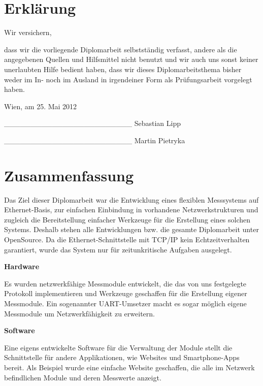 \documentclass[a4paper,14pt,headsepline]{scrartcl}
\begin{document}
\newpage

\onehalfspacing

\section*{Erklärung}
Wir versichern,

dass wir die vorliegende Diplomarbeit selbstständig verfasst, andere als die angegebenen Quellen und Hilfsmittel nicht benutzt und wir auch uns sonst keiner unerlaubten Hilfe bedient haben, dass wir dieses Diplomarbeitsthema bisher weder im In- noch im Ausland in irgendeiner Form als Prüfungsarbeit vorgelegt haben. 

Wien, am 25. Mai 2012

\_\_\_\_\_\_\_\_\_\_\_\_\_\_\_\_\_\_\_\_\_\_\_\_   \newline Sebastian Lipp 

\_\_\_\_\_\_\_\_\_\_\_\_\_\_\_\_\_\_\_\_\_\_\_\_   \newline Martin Pietryka

\newpage

\section*{Zusammenfassung}
Das Ziel dieser Diplomarbeit war die Entwicklung eines flexiblen Messsystems auf Ethernet-Basis, zur einfachen Einbindung in vorhandene Netzwerkstrukturen und zugleich die Bereitstellung einfacher Werkzeuge für die Erstellung eines solchen Systems. Deshalb stehen alle Entwicklungen bzw. die gesamte Diplomarbeit unter OpenSource. Da die Ethernet-Schnittstelle mit TCP/IP kein Echtzeitverhalten garantiert, wurde das System nur für zeitunkritische Aufgaben ausgelegt. 

\textbf{Hardware}

Es wurden netzwerkfähige Messmodule entwickelt, die das von uns festgelegte Protokoll implementieren und Werkzeuge geschaffen für die Erstellung eigener Messmodule. Ein sogenannter UART-Umsetzer macht es sogar möglich eigene Messmodule um Netzwerkfähigkeit zu erweitern. 

\textbf{Software}

Eine eigens entwickelte Software für die Verwaltung der Module stellt die Schnittstelle für andere Applikationen, wie Websites und Smartphone-Apps bereit. Als Beispiel wurde eine einfache Website geschaffen, die alle im Netzwerk befindlichen Module und deren Messwerte anzeigt. 

\newpage
\end{document}
